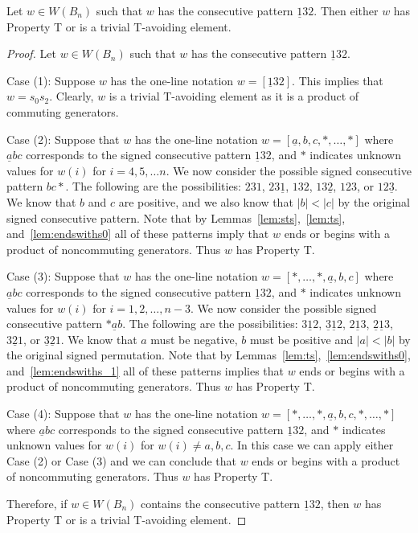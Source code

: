 \begin{lemma}\label{lem:132}
Let $w \in W(B_n)$ such that $w$ has the consecutive pattern $\underline{1}32$. Then either $w$ has Property T or is a trivial T-avoiding element.
\begin{proof}
	Let $w \in W(B_n)$ such that $w$ has the consecutive pattern $\underline{1}32$.
	
	Case (1): Suppose $w$ has the one-line notation $w=[\underline{1}32]$. This implies that $w=s_0s_2$. Clearly, $w$ is a trivial T-avoiding element as it is a product of commuting generators.
	
	Case (2): Suppose that $w$ has the one-line notation $w=[\underline{a},b,c, \ast, \ldots, \ast]$ where $\underline{a}bc$ corresponds to the signed consecutive pattern $\underline{1}32$, and $\ast$ indicates unknown values for $w(i)$ for $i=4,5, \ldots n$. We now consider the possible signed consecutive pattern $bc \ast$. The following are the possibilities: $231$, $23 \underline{1}$, $13 2$, $13 \underline{2}$, $123$, or $12\underline{3}$. We know that $b$ and $c$ are positive, and we also know that $|b|<|c|$ by the original signed consecutive pattern. Note that by Lemmas~\ref{lem:sts},~\ref{lem:ts}, and~\ref{lem:endswiths0} all of these patterns imply that $w$ ends or begins with a product of noncommuting generators. Thus $w$ has Property T.
	
	Case (3): Suppose that $w$ has the one-line notation $w=[\ast, \ldots, \ast, \underline{a},b,c]$ where $\underline{a}bc$ corresponds to the signed consecutive pattern $\underline{1}32$, and $\ast$ indicates unknown values for $w(i)$ for $i=1,2, \ldots ,n-3$. We now consider the possible signed consecutive pattern $\ast \underline{a} b$. The following are the possibilities: $3 \underline{1} 2$, $\underline{3} \underline{1} 2$, $2 \underline{1} 3$, $\underline{2} \underline{1} 3$, $3 \underline{2} 1$, or $\underline{3} \underline{2} 1$. We know that $a$ must be negative, $b$ must be positive and $|a|<|b|$ by the original signed permutation. Note that by Lemmas~\ref{lem:ts},~\ref{lem:endswiths0}, and~\ref{lem:endswiths_1} all of these patterns implies that $w$ ends or begins with a product of noncommuting generators. Thus $w$ has Property T. 
	
	Case (4): Suppose that $w$ has the one-line notation $w=[\ast, \ldots, \ast, \underline{a},b,c, \ast, \ldots, \ast]$ where $\underline{a}bc$ corresponds to the signed consecutive pattern $\underline{1}32$, and $\ast$ indicates unknown values for $w(i)$ for $w(i)\neq a,b,c$. In this case we can apply either Case (2) or Case (3) and we can conclude that $w$ ends or begins with a product of noncommuting generators. Thus $w$ has Property T.
	
	Therefore, if $w \in W(B_n)$ contains the consecutive pattern $\underline{1}32$, then $w$ has Property T or is a trivial T-avoiding element.
\end{proof}	
\end{lemma}

